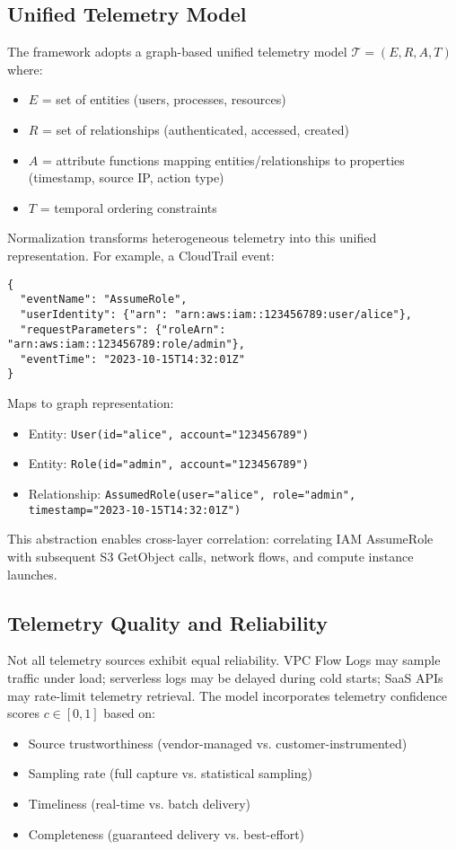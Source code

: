 \subsection{Unified Telemetry Model}
The framework adopts a graph-based unified telemetry model $\mathcal{T} = (E, R, A, T)$ where:
\begin{itemize}
    \item $E$ = set of entities (users, processes, resources)
    \item $R$ = set of relationships (authenticated, accessed, created)
    \item $A$ = attribute functions mapping entities/relationships to properties (timestamp, source IP, action type)
    \item $T$ = temporal ordering constraints
\end{itemize}

Normalization transforms heterogeneous telemetry into this unified representation. For example, a CloudTrail event:
\begin{verbatim}
{
  "eventName": "AssumeRole",
  "userIdentity": {"arn": "arn:aws:iam::123456789:user/alice"},
  "requestParameters": {"roleArn": "arn:aws:iam::123456789:role/admin"},
  "eventTime": "2023-10-15T14:32:01Z"
}
\end{verbatim}

Maps to graph representation:
\begin{itemize}
    \item Entity: \texttt{User(id="alice", account="123456789")}
    \item Entity: \texttt{Role(id="admin", account="123456789")}
    \item Relationship: \texttt{AssumedRole(user="alice", role="admin", timestamp="2023-10-15T14:32:01Z")}
\end{itemize}

This abstraction enables cross-layer correlation: correlating IAM AssumeRole with subsequent S3 GetObject calls, network flows, and compute instance launches.

\subsection{Telemetry Quality and Reliability}
Not all telemetry sources exhibit equal reliability. VPC Flow Logs may sample traffic under load; serverless logs may be delayed during cold starts; SaaS APIs may rate-limit telemetry retrieval. The model incorporates telemetry confidence scores $c \in [0,1]$ based on:
\begin{itemize}
    \item Source trustworthiness (vendor-managed vs. customer-instrumented)
    \item Sampling rate (full capture vs. statistical sampling)
    \item Timeliness (real-time vs. batch delivery)
    \item Completeness (guaranteed delivery vs. best-effort)
\end{itemize}

